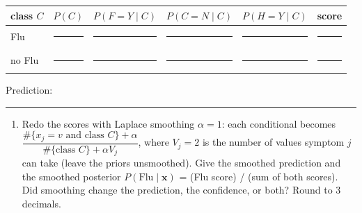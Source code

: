 \documentclass[
  11pt,
]{article}
\newcounter{none} %
\providecommand{\tightlist}{%
  \setlength{\itemsep}{0pt}\setlength{\parskip}{0pt}}
\newcommand{\answerspace}[1]{\par\vspace*{#1}}  %
\newcommand{\blank}[1][1.2in]{\rule{#1}{0.4pt}}
\begin{document}
{\def\LTcaptype{none} %
\begin{longtable}[]{@{}
  >{\raggedright\arraybackslash}p{}
  >{\raggedright\arraybackslash}p{}
  >{\raggedright\arraybackslash}p{}
  >{\raggedright\arraybackslash}p{}
  >{\raggedright\arraybackslash}p{}
  >{\raggedright\arraybackslash}p{}@{}}
\toprule\noalign{}
\begin{minipage}[b]{\linewidth}\raggedright
class \(C\)
\end{minipage} & \begin{minipage}[b]{\linewidth}\raggedright
\(P(C)\)
\end{minipage} & \begin{minipage}[b]{\linewidth}\raggedright
\(P(F{=}Y \mid C)\)
\end{minipage} & \begin{minipage}[b]{\linewidth}\raggedright
\(P(C{=}N \mid C)\)
\end{minipage} & \begin{minipage}[b]{\linewidth}\raggedright
\(P(H{=}Y \mid C)\)
\end{minipage} & \begin{minipage}[b]{\linewidth}\raggedright
score
\end{minipage} \\
\midrule\noalign{}
\endhead
\bottomrule\noalign{}
\endlastfoot
Flu & \blank[0.7in] & \blank[0.7in] & \blank[0.7in] & \blank[0.7in] &
\blank[0.7in] \\
no Flu & \blank[0.7in] & \blank[0.7in] & \blank[0.7in] & \blank[0.7in] &
\blank[0.7in] \\
\end{longtable}
}

Prediction: \blank[0.8in]

\answerspace{1.5in}
\newpage

\begin{enumerate}
\def\labelenumi{(\alph{enumi})}
\setcounter{enumi}{1}
\tightlist
\item
  Redo the scores with Laplace smoothing \(\alpha = 1\): each
  conditional becomes
  \(\dfrac{\#\{x_j = v \text{ and class } C\} + \alpha}{\#\{\text{class } C\} + \alpha V_j}\),
  where \(V_j = 2\) is the number of values symptom \(j\) can take
  (leave the priors unsmoothed). Give the smoothed prediction and the
  smoothed posterior \(P(\text{Flu} \mid \mathbf{x})\) = (Flu score) /
  (sum of both scores). Did smoothing change the prediction, the
  confidence, or both? Round to 3 decimals.
\end{enumerate}
\end{document}
